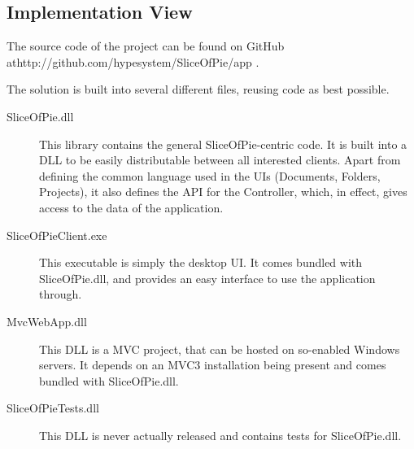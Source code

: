 \subsection{Implementation View}

The source code of the project can be found on GitHub at\newline http://github.com/hypesystem/SliceOfPie/app .

The solution is built into several different files, reusing code as best possible.

\begin{description}
    \item[SliceOfPie.dll] This library contains the general SliceOfPie-centric code. It is built into a
        DLL to be easily distributable between all interested clients. Apart from defining the common
        language used in the UIs (Documents, Folders, Projects), it also defines the API for the
        Controller, which, in effect, gives access to the data of the application.
    \item[SliceOfPieClient.exe] This executable is simply the desktop UI. It comes bundled with
        SliceOfPie.dll, and provides an easy interface to use the application through.
    \item[MvcWebApp.dll] This DLL is a MVC project, that can be hosted on so-enabled Windows servers.
        It depends on an MVC3 installation being present and comes bundled with SliceOfPie.dll.
    \item[SliceOfPieTests.dll] This DLL is never actually released and contains tests for SliceOfPie.dll.
\end{description}